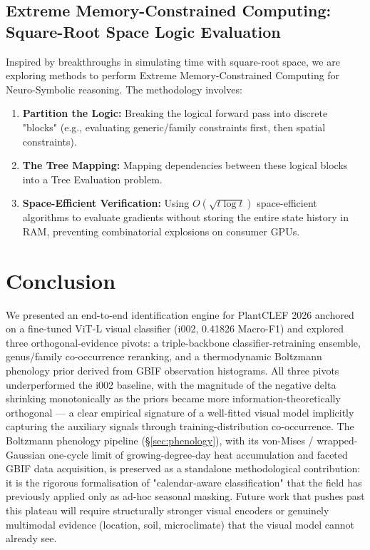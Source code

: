 \documentclass[10pt,twocolumn,letterpaper]{article}
\begin{document}
\subsection{Extreme Memory-Constrained Computing: Square-Root Space Logic Evaluation}
Inspired by breakthroughs in simulating time with square-root space, we are exploring methods to perform Extreme Memory-Constrained Computing for Neuro-Symbolic reasoning. The methodology involves:
\begin{enumerate}
    \item \textbf{Partition the Logic:} Breaking the logical forward pass into discrete "blocks" (e.g., evaluating generic/family constraints first, then spatial constraints).
    \item \textbf{The Tree Mapping:} Mapping dependencies between these logical blocks into a Tree Evaluation problem.
    \item \textbf{Space-Efficient Verification:} Using $O(\sqrt{t \log t})$ space-efficient algorithms to evaluate gradients without storing the entire state history in RAM, preventing combinatorial explosions on consumer GPUs.
\end{enumerate}

\section{Conclusion}

We presented an end-to-end identification engine for PlantCLEF 2026 anchored on a fine-tuned ViT-L visual classifier (i002, 0.41826 Macro-F1) and explored three orthogonal-evidence pivots: a triple-backbone classifier-retraining ensemble, genus/family co-occurrence reranking, and a thermodynamic Boltzmann phenology prior derived from GBIF observation histograms. All three pivots underperformed the i002 baseline, with the magnitude of the negative delta shrinking monotonically as the priors became more information-theoretically orthogonal --- a clear empirical signature of a well-fitted visual model implicitly capturing the auxiliary signals through training-distribution co-occurrence. The Boltzmann phenology pipeline (\S\ref{sec:phenology}), with its von-Mises / wrapped-Gaussian one-cycle limit of growing-degree-day heat accumulation and faceted GBIF data acquisition, is preserved as a standalone methodological contribution: it is the rigorous formalisation of "calendar-aware classification" that the field has previously applied only as ad-hoc seasonal masking. Future work that pushes past this plateau will require structurally stronger visual encoders or genuinely multimodal evidence (location, soil, microclimate) that the visual model cannot already see.
\end{document}
